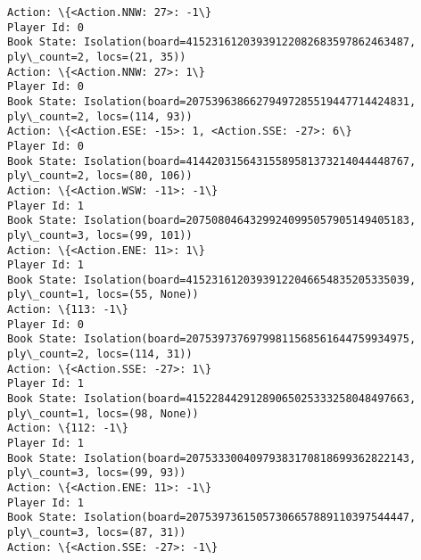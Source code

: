 \documentclass[11pt]{article}
\begin{document}
\begin{Verbatim}[commandchars=\\\{\}]
Action: \{<Action.NNW: 27>: -1\}
Player Id: 0
Book State: Isolation(board=41523161203939122082683597862463487, ply\_count=2, locs=(21, 35))
Action: \{<Action.NNW: 27>: 1\}
Player Id: 0
Book State: Isolation(board=20753963866279497285519447714424831, ply\_count=2, locs=(114, 93))
Action: \{<Action.ESE: -15>: 1, <Action.SSE: -27>: 6\}
Player Id: 0
Book State: Isolation(board=41442031564315589581373214044448767, ply\_count=2, locs=(80, 106))
Action: \{<Action.WSW: -11>: -1\}
Player Id: 1
Book State: Isolation(board=20750804643299240995057905149405183, ply\_count=3, locs=(99, 101))
Action: \{<Action.ENE: 11>: 1\}
Player Id: 1
Book State: Isolation(board=41523161203939122046654835205335039, ply\_count=1, locs=(55, None))
Action: \{113: -1\}
Player Id: 0
Book State: Isolation(board=20753973769799811568561644759934975, ply\_count=2, locs=(114, 31))
Action: \{<Action.SSE: -27>: 1\}
Player Id: 1
Book State: Isolation(board=41522844291289065025333258048497663, ply\_count=1, locs=(98, None))
Action: \{112: -1\}
Player Id: 1
Book State: Isolation(board=20753330040979383170818699362822143, ply\_count=3, locs=(99, 93))
Action: \{<Action.ENE: 11>: -1\}
Player Id: 1
Book State: Isolation(board=20753973615057306657889110397544447, ply\_count=3, locs=(87, 31))
Action: \{<Action.SSE: -27>: -1\}


\end{Verbatim}
\end{document}
